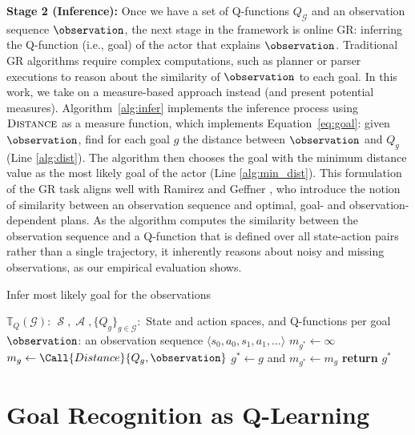 \documentclass[letterpaper]{article} %
\DeclareMathOperator{\statespace}{\mathcal{S}}
\DeclareMathOperator{\actionspace}{\mathcal{A}}
\providecommand\theory{\mathbb{T}}
\providecommand\goals{\mathcal{G}}
\providecommand\goal{g}
\begin{document}
\noindent \textbf{Stage 2 (Inference):} Once we have a set of Q-functions $Q_{\goals}$ and an observation sequence $\observation$, the next stage in the framework is online GR: inferring the Q-function (i.e., goal) of the actor that explains $\observation$.
Traditional GR algorithms require complex computations, such as planner or parser executions to reason about the similarity of $\observation$ to each goal.
In this work, we take on a measure-based approach instead (and present potential measures).
Algorithm~\ref{alg:infer} implements the inference process using $\textsc{Distance}$ as a measure function, which implements Equation~\ref{eq:goal}: given $\observation$, find for each goal $g$ the distance between $\observation$ and $Q_g$ (Line \ref{alg:dist}).
The algorithm then chooses the goal with the minimum distance value as the most likely goal of the actor (Line \ref{alg:min_dist}).
This formulation of the GR task aligns well with Ramirez and Geffner , who introduce the notion of similarity between an observation sequence and optimal, goal- and observation-dependent plans.
As the algorithm computes the similarity between the observation sequence and a Q-function that is defined over all state-action pairs rather than a single trajectory, it inherently reasons about noisy and missing observations, as our empirical evaluation shows.


\begin{algorithm}[t]
    \caption{Infer most likely goal for the observations}
    \label{alg:infer}
\begin{algorithmic}[1]
    \small
    \Require $\theory_Q(\goals)$: $\statespace, \actionspace, \{Q_g\}_{g \in \goals}:$ State and action spaces, and Q-functions per goal
    \Require $\observation$: an observation sequence $\langle s_0, a_0, s_1, a_1, \ldots \rangle$
    \State $m_{g^*} \gets \infty$ 
    \ForAll{$\goal \in \goals$} 
        \State $m_g \gets \Call{Distance}{Q_g, \observation}$ 
        \label{alg:dist}
            \State $g^* \gets g$ and $m_{g^*} \gets m_g$
        \EndIf
    \EndFor
    \State \textbf{return} $g^*$
    \label{alg:min_dist}
\end{algorithmic}
\end{algorithm}


\section*{Goal Recognition as Q-Learning}
\label{sec:graql}
\end{document}
